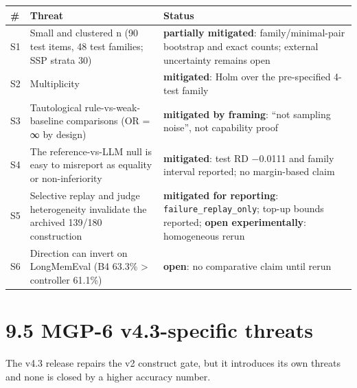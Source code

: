 {\def\LTcaptype{none} %
\begin{longtable}[]{@{}
  >{\raggedright\arraybackslash}p{}
  >{\raggedright\arraybackslash}p{}
  >{\raggedright\arraybackslash}p{}@{}}
\toprule\noalign{}
\begin{minipage}[b]{\linewidth}\raggedright
\#
\end{minipage} & \begin{minipage}[b]{\linewidth}\raggedright
Threat
\end{minipage} & \begin{minipage}[b]{\linewidth}\raggedright
Status
\end{minipage} \\
\midrule\noalign{}
\endhead
\bottomrule\noalign{}
\endlastfoot
S1 & Small and clustered n (90 test items, 48 test families; SSP strata
30) & \textbf{partially mitigated}: family/minimal-pair bootstrap and
exact counts; external uncertainty remains open \\
S2 & Multiplicity & \textbf{mitigated}: Holm over the pre-specified
4-test family \\
S3 & Tautological rule-vs-weak-baseline comparisons (OR = ∞ by design) &
\textbf{mitigated by framing}: ``not sampling noise'', not capability
proof \\
S4 & The reference-vs-LLM null is easy to misreport as equality or
non-inferiority & \textbf{mitigated}: test RD −0.0111 and family
interval reported; no margin-based claim \\
S5 & Selective replay and judge heterogeneity invalidate the archived
139/180 construction & \textbf{mitigated for reporting}:
\texttt{failure\_replay\_only}; top-up bounds reported; \textbf{open
experimentally}: homogeneous rerun \\
S6 & Direction can invert on LongMemEval (B4 63.3\% \textgreater{}
controller 61.1\%) & \textbf{open}: no comparative claim until rerun \\
\end{longtable}
}

\section{9.5 MGP-6 v4.3-specific
threats}\label{mgp-6-v4.3-specific-threats}

The v4.3 release repairs the v2 construct gate, but it introduces its
own threats and none is closed by a higher accuracy number.

